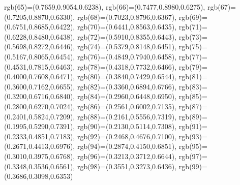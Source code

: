 {{        rgb(65)=(0.7659,0.9054,0.6238),
        rgb(66)=(0.7477,0.8980,0.6275),
        rgb(67)=(0.7205,0.8870,0.6330),
        rgb(68)=(0.7023,0.8796,0.6367),
        rgb(69)=(0.6751,0.8685,0.6422),
        rgb(70)=(0.6441,0.8563,0.6435),
        rgb(71)=(0.6228,0.8480,0.6438),
        rgb(72)=(0.5910,0.8355,0.6443),
        rgb(73)=(0.5698,0.8272,0.6446),
        rgb(74)=(0.5379,0.8148,0.6451),
        rgb(75)=(0.5167,0.8065,0.6454),
        rgb(76)=(0.4849,0.7940,0.6458),
        rgb(77)=(0.4531,0.7815,0.6463),
        rgb(78)=(0.4318,0.7732,0.6466),
        rgb(79)=(0.4000,0.7608,0.6471),
        rgb(80)=(0.3840,0.7429,0.6544),
        rgb(81)=(0.3600,0.7162,0.6655),
        rgb(82)=(0.3360,0.6894,0.6766),
        rgb(83)=(0.3200,0.6716,0.6840),
        rgb(84)=(0.2960,0.6448,0.6950),
        rgb(85)=(0.2800,0.6270,0.7024),
        rgb(86)=(0.2561,0.6002,0.7135),
        rgb(87)=(0.2401,0.5824,0.7209),
        rgb(88)=(0.2161,0.5556,0.7319),
        rgb(89)=(0.1995,0.5290,0.7391),
        rgb(90)=(0.2130,0.5114,0.7308),
        rgb(91)=(0.2333,0.4851,0.7183),
        rgb(92)=(0.2468,0.4676,0.7100),
        rgb(93)=(0.2671,0.4413,0.6976),
        rgb(94)=(0.2874,0.4150,0.6851),
        rgb(95)=(0.3010,0.3975,0.6768),
        rgb(96)=(0.3213,0.3712,0.6644),
        rgb(97)=(0.3348,0.3536,0.6561),
        rgb(98)=(0.3551,0.3273,0.6436),
        rgb(99)=(0.3686,0.3098,0.6353)
    }
}
